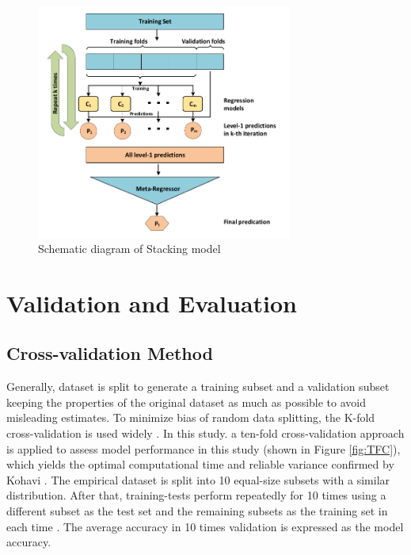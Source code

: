 \documentclass[11pt]{article}
\begin{document}
	
	\begin{figure}[!h]	
		\begin{center}
			\includegraphics[width=0.75\textwidth]{SP}
		\end{center}
		\caption{Schematic diagram of Stacking model \cite{sill2009feature}}
		\label{fig:Stack}
	\end{figure}
	
	
	
	
	
	\section{Validation and Evaluation}
	\label{4}
	
	
	
	\subsection{Cross-validation Method}
	\label{cross}
	Generally, dataset is split to generate a training subset and a validation subset keeping the properties of the original dataset as much as possible to avoid misleading estimates. To minimize bias of random data splitting, the K-fold cross-validation is used widely \cite{chou2014machine}. In this study. a ten-fold cross-validation approach is applied to assess model performance in this study (shown in Figure \ref{fig:TFC}), which yields the optimal computational time and reliable variance confirmed by Kohavi \cite{kohavi1995study}. The empirical dataset is split into 10 equal-size subsets with a similar distribution. After that, training-tests perform repeatedly for 10 times using a different subset as the test set and the remaining subsets as the training set in each time \cite{dor2007achieving}. The average accuracy in 10 times validation is expressed as the model accuracy.
	
\end{document}
